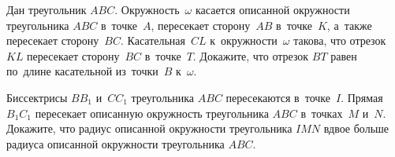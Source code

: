 \begin{problems}
\item
Дан треугольник $ABC$.
Окружность~$\omega$ касается описанной окружности треугольника $ABC$
в~точке~$A$, пересекает сторону~$AB$ в~точке~$K$, а~также пересекает
сторону~$BC$.
Касательная~$CL$ к~окружности~$\omega$ такова, что отрезок~$KL$ пересекает
сторону~$BC$ в~точке~$T$.
Докажите, что отрезок $BT$ равен по~длине касательной из~точки~$B$ к~$\omega$.

\item
Биссектрисы $B B_1$ и~$C C_1$ треугольника $ABC$ пересекаются в~точке~$I$.
Прямая~$B_1 C_1$ пересекает описанную окружность треугольника $ABC$
в~точках~$M$ и~$N$.
Докажите, что радиус описанной окружности треугольника $IMN$ вдвое больше
радиуса описанной окружности треугольника $ABC$.

\end{problems}

